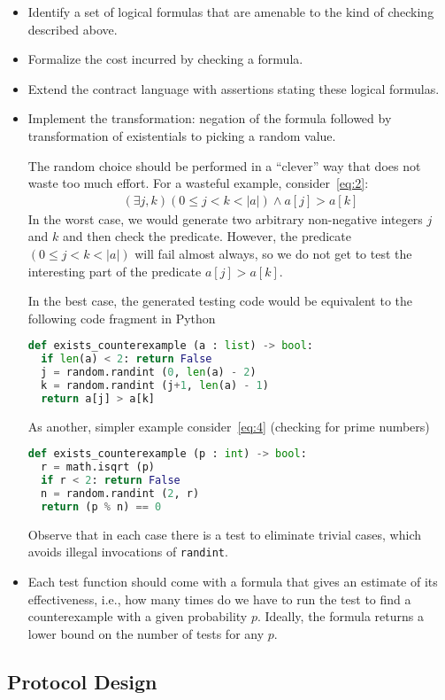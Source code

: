 \documentclass{article}
\begin{document}
\begin{itemize}
\item Identify a set of logical formulas that are amenable to the kind of checking
  described above.
\item Formalize the cost incurred by checking a formula.
\item Extend the contract language with assertions stating these logical formulas.
\item Implement the transformation: negation of the formula followed by transformation
  of existentials to picking a random value.

  The random choice should be performed in a ``clever'' way that does not waste too
  much effort. For a wasteful example, consider~\eqref{eq:2}:
  \begin{gather*}
    (\exists j, k ) (0\le j< k < |a|) \wedge a[j] > a[k]
  \end{gather*}
  In the worst case, we would generate two arbitrary non-negative integers $j$ and $k$
  and then check the predicate. However, the predicate $(0\le j< k < |a|)$ will fail
  almost always, so we do not get to test the interesting part of the predicate
  $a[j]>a[k]$.

  In the best case, the generated testing code would be equivalent to the following code fragment
  in Python
\begin{lstlisting}[language=Python]
def exists_counterexample (a : list) -> bool:
  if len(a) < 2: return False
  j = random.randint (0, len(a) - 2)
  k = random.randint (j+1, len(a) - 1)
  return a[j] > a[k]
\end{lstlisting}

  As another, simpler example consider~\eqref{eq:4} (checking for prime numbers)
\begin{lstlisting}[language=Python]
def exists_counterexample (p : int) -> bool:
  r = math.isqrt (p)
  if r < 2: return False
  n = random.randint (2, r)
  return (p % n) == 0
\end{lstlisting}

  Observe that in each case there is a test to eliminate trivial cases, which avoids
  illegal invocations of \lstinline/randint/.
\item Each test function should come with a formula that gives an estimate of
  its effectiveness, i.e., how many times do we have to run the test to find a
  counterexample with a given probability $p$. Ideally, the formula returns a lower
  bound on the number of tests for any $p$.
\end{itemize}

\subsection{Protocol Design}
\label{sec:protocol-design}
\end{document}

